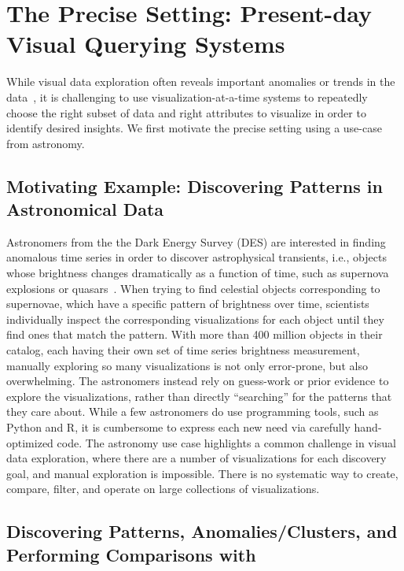
\section{The Precise Setting: Present-day Visual Querying Systems}\label{sec:precise}
While visual data exploration often reveals 
important anomalies or trends 
in the data~\cite{Heer2012,Morton2014}, 
it is challenging to 
use visualization-at-a-time systems to 
repeatedly choose the right subset of 
data and right attributes to visualize
in order to identify desired insights.
We first motivate
the precise setting using a use-case from
astronomy.

\subsection{Motivating Example: Discovering Patterns in Astronomical Data}
Astronomers from the the Dark Energy Survey (DES) 
are interested in finding 
anomalous time series 
in order to discover 
astrophysical transients, 
i.e., objects whose brightness 
changes dramatically as a function of time, 
such as supernova explosions or quasars~\cite{Drlica-Wagner2017}. 
When trying to find celestial objects 
corresponding to supernovae, 
which have a specific pattern of brightness over time, 
scientists individually inspect the corresponding 
visualizations for each object until 
they find ones that match the pattern. 
With more than 400 million objects in their catalog, 
each having their own set of time series brightness measurement, 
manually exploring so many 
visualizations is not only error-prone, 
but also overwhelming.
The astronomers instead rely on guess-work 
or prior evidence to explore the visualizations,
rather than directly ``searching'' for the patterns
that they care about. 
While a few astronomers do use 
programming tools, such as Python and R,
it is cumbersome to express each new need
via carefully hand-optimized code. 
The astronomy use case highlights a 
common challenge in visual data exploration,
where there are a number of visualizations
for each discovery goal,
and manual exploration is impossible.
There is no systematic way to create, compare, filter,
and operate on large collections of visualizations.

\subsection{Discovering Patterns, Anomalies/Clusters, and Performing Comparisons with \zv}


